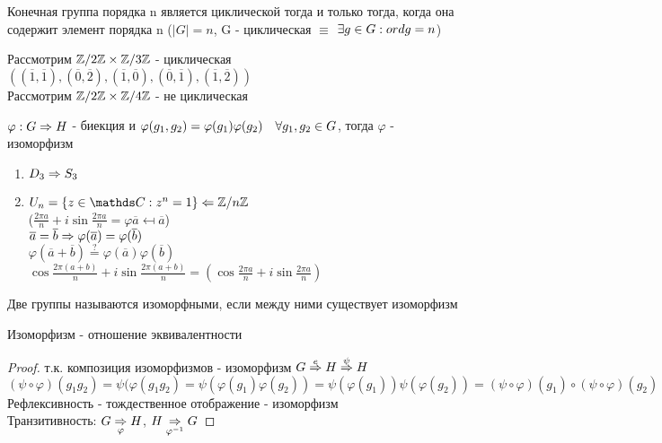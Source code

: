 \documentclass[12pt, fleqn]{article}
\begin{document}
\begin{definition}
    Конечная группа порядка n является циклической тогда и только тогда, когда она содержит элемент порядка n ($|G|=n$, G - циклическая $\equiv$ $\exists g \in G: ord g = n$)
\end{definition}
Рассмотрим $\mathbb{Z} /2 \mathbb{Z} \times \mathbb{Z} /3 \mathbb{Z}$ - циклическая\\
$((\overline{1},\overline{1}), (\overline{0}, \overline{2}), (\overline{1}, \overline{0}), (\overline{0}, \overline{1}), (\overline{1},\overline{2}))$\\
Рассмотрим $\mathbb{Z} /2 \mathbb{Z} \times \mathbb{Z} /4 \mathbb{Z}$ - не циклическая

\begin{definition}
    $\varphi: G \Rightarrow H$ - биекция и $\varphi(g_1,g_2)=\varphi(g_1) \varphi(g_2)\quad \forall g_1,g_2 \in G$, тогда $\varphi$ - изоморфизм 
\end{definition}

\begin{examples}
    \begin{enumerate}
        \item $D_3 \Rightarrow S_3$
        \item $U_n=\{z\in \CC: z^n=1\} \la \Z / n \Z$\\
        ($\frac{2\pi a}{n}+i \sin \frac{2\pi a}{n} = \varphi \overline{a} \mapsfrom \overline{a}$)\\
        $\overline{a}=\overline{b} \Rightarrow \varphi(\overline{a})=\varphi(\overline{b})$\\
        $\varphi(\overline{a}+\overline{b}) \overset{?}{=} \varphi(\overline{a})\varphi(\overline{b})$\\
        $\cos \frac{2\pi(a+b)}{n}+i \sin \frac{2\pi(a+b)}{n}=(\cos\frac{2\pi a}{n} + i \sin \frac{2\pi a}{n}) $
    \end{enumerate}
\end{examples}

\begin{definition}
    Две группы называются изоморфными, если между ними существует изоморфизм
\end{definition}

\begin{utv}
    Изоморфизм - отношение эквивалентности
\end{utv}

\begin{proof} 
    т.к. композиция изоморфизмов - изоморфизм $G \overset{e}{\Rightarrow} H \overset{\psi}{\Rightarrow} H$\\
    $(\psi \circ \varphi)(g_1 g_2)= \psi(\varphi(g_1 g_2)=\psi(\varphi(g_1) \varphi(g_2))=\psi(\varphi(g_1)) \psi(\varphi(g_2)) = (\psi \circ \varphi)(g_1) \circ (\psi \circ \varphi)(g_2)$\\
    Рефлексивность - тождественное отображение - изоморфизм\\
    Транзитивность: $G \underset{\varphi}{\Rightarrow} H$, $H \underset{\varphi^{-1}}{\Rightarrow} G$
\end{proof}
\end{document}
